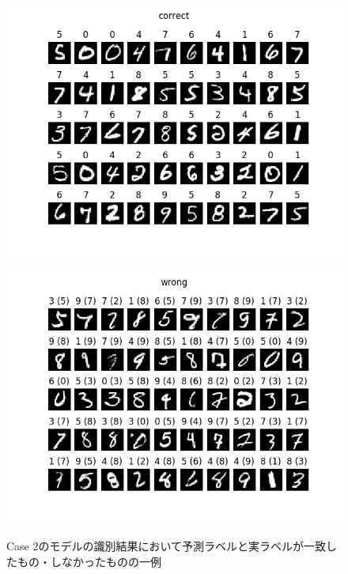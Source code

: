 \documentclass[class=jsarticle, crop=false, dvipdfmx, fleqn]{standalone}
\begin{document}
\begin{figure}
	\begin{minipage}[b]{0.45\linewidth}
		\centering
		\includegraphics[clip, width=\linewidth]{../figures/result_assignment2_case2_correct.png}
		\label{fig:case2_correct}
	\end{minipage}
	\begin{minipage}[b]{0.45\linewidth}
		\centering
		\includegraphics[clip, width=\linewidth]{../figures/result_assignment2_case2_wrong.png}
		\label{fig:case2_wrong}
	\end{minipage}
	\caption{Case 2のモデルの識別結果において予測ラベルと実ラベルが一致したもの・しなかったものの一例}
	\label{fig:case2_result}
\end{figure}
\end{document}
